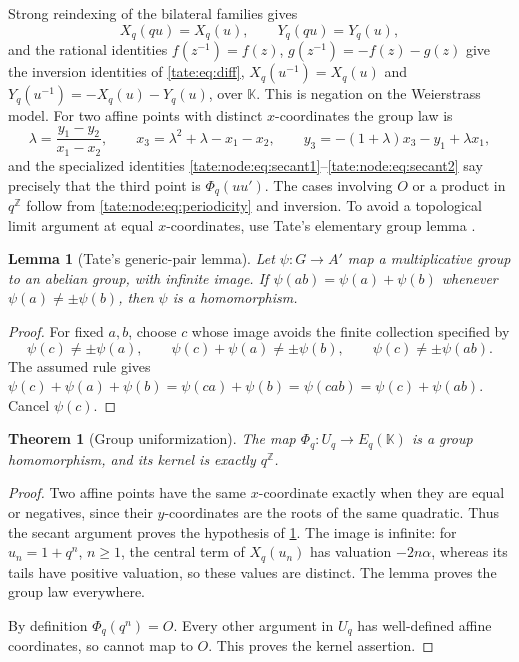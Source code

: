 \documentclass[11pt,letterpaper]{article}
\newtheorem{theorem}{Theorem}[section]
\newtheorem{lemma}[lemma]{Lemma}
\theoremstyle{definition}
\newcommand{\Z}{\mathbb Z}
\newcommand{\KK}{\mathbb K}
\begin{document}
Strong reindexing of the bilateral families gives
\begin{equation}
 X_q(qu)=X_q(u),\qquad Y_q(qu)=Y_q(u),\label{tate:node:eq:periodicity}
\end{equation}
and the rational identities $f(z^{-1})=f(z)$, $g(z^{-1})=-f(z)-g(z)$ give
the inversion identities of \eqref{tate:eq:diff},
$X_q(u^{-1})=X_q(u)$ and $Y_q(u^{-1})=-X_q(u)-Y_q(u)$, over $\KK$. This is
negation on the Weierstrass model. For two affine points with distinct
$x$-coordinates the group law is
\[
 \lambda=\frac{y_1-y_2}{x_1-x_2},\qquad
 x_3=\lambda^2+\lambda-x_1-x_2,
 \qquad y_3=-(1+\lambda)x_3-y_1+\lambda x_1,
\]
and the specialized identities
\eqref{tate:node:eq:secant1}--\eqref{tate:node:eq:secant2} say precisely that
the third point is $\Phi_q(uu')$. The cases involving $O$ or a product in
$q^\Z$ follow from \eqref{tate:node:eq:periodicity} and inversion. To avoid a
topological limit argument at equal $x$-coordinates, use Tate's elementary
group lemma \cite[Lemma~1]{Tate}.

\begin{lemma}[Tate's generic-pair lemma]\label{tate:node:lem:generic}
Let $\psi:G\to A'$ map a multiplicative group to an abelian group, with
infinite image. If $\psi(ab)=\psi(a)+\psi(b)$ whenever
$\psi(a)\ne\pm\psi(b)$, then $\psi$ is a homomorphism.
\end{lemma}

\begin{proof}
For fixed $a,b$, choose $c$ whose image avoids the finite collection
specified by
\[
 \psi(c)\ne\pm\psi(a),\qquad
 \psi(c)+\psi(a)\ne\pm\psi(b),\qquad
 \psi(c)\ne\pm\psi(ab).
\]
The assumed rule gives
$\psi(c)+\psi(a)+\psi(b)=\psi(ca)+\psi(b)=\psi(cab)=\psi(c)+\psi(ab)$.
Cancel $\psi(c)$.
\end{proof}

\begin{theorem}[Group uniformization]\label{tate:node:thm:group}
The map $\Phi_q:U_q\to E_q(\KK)$ is a group homomorphism, and its kernel is
exactly $q^\Z$.
\end{theorem}

\begin{proof}
Two affine points have the same $x$-coordinate exactly when they are equal
or negatives, since their $y$-coordinates are the roots of the same
quadratic. Thus the secant argument proves the hypothesis of
\cref{tate:node:lem:generic}. The image is infinite: for $u_n=1+q^n$,
$n\ge1$, the central term of $X_q(u_n)$ has valuation $-2n\alpha$, whereas
its tails have positive valuation, so these values are distinct. The lemma
proves the group law everywhere.

By definition $\Phi_q(q^n)=O$. Every other argument in $U_q$ has
well-defined affine coordinates, so cannot map to $O$. This proves the
kernel assertion.
\end{proof}
\end{document}
